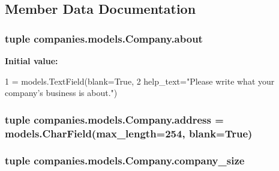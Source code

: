 \subsection{Member Data Documentation}
\hypertarget{classcompanies_1_1models_1_1_company_ab12d8c270126084d94ff00f7e4df9158}{
\subsubsection[{about}]{\setlength{\rightskip}{0pt plus 5cm}tuple companies.\-models.\-Company.\-about\hspace{0.3cm}{\ttfamily [static]}}}\label{classcompanies_1_1models_1_1_company_ab12d8c270126084d94ff00f7e4df9158}
{\bfseries Initial value\-:}
\begin{DoxyCode}
1 = models.TextField(blank=\textcolor{keyword}{True},
2                              help\_text=\textcolor{stringliteral}{"Please write what your company's business is about."})
\end{DoxyCode}
\hypertarget{classcompanies_1_1models_1_1_company_ad368167700b1ab00c332ddc6a8c55de8}{
\subsubsection[{address}]{\setlength{\rightskip}{0pt plus 5cm}tuple companies.\-models.\-Company.\-address = models.\-Char\-Field(max\-\_\-length=254, blank=True)\hspace{0.3cm}{\ttfamily [static]}}}\label{classcompanies_1_1models_1_1_company_ad368167700b1ab00c332ddc6a8c55de8}
\hypertarget{classcompanies_1_1models_1_1_company_a70395dad6162c2cd6206d09bfd078c4e}{
\subsubsection[{company\-\_\-size}]{\setlength{\rightskip}{0pt plus 5cm}tuple companies.\-models.\-Company.\-company\-\_\-size\hspace{0.3cm}{\ttfamily [static]}}}\label{classcompanies_1_1models_1_1_company_a70395dad6162c2cd6206d09bfd078c4e}
